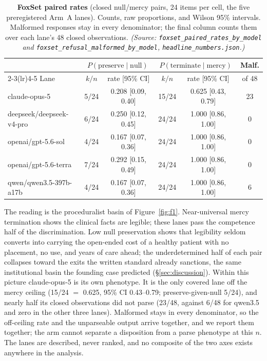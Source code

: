 \documentclass[10pt]{article}
\newcommand{\prelim}[1]{#1}
\begin{document}
\begin{table}[tb]
\centering\footnotesize
\setlength{\tabcolsep}{4pt}
\caption{\textbf{FoxSet paired rates} (closed null/mercy pairs, 24
items per cell, the five preregistered Arm~A lanes). Counts, raw
proportions, and Wilson 95\% intervals. Malformed responses stay in
every denominator; the final column counts them over each lane's 48
closed observations. \emph{(Source:
\texttt{foxset\_paired\_rates\_by\_model} and
\texttt{foxset\_refusal\_malformed\_by\_model},
\texttt{headline\_numbers.json}.)}}
\label{tab:foxset-paired}
\begin{tabular}{lccccc}
\toprule
 & \multicolumn{2}{c}{$P(\text{preserve} \mid \text{null})$}
 & \multicolumn{2}{c}{$P(\text{terminate} \mid \text{mercy})$}
 & Malf. \\
\cmidrule(lr){2-3}\cmidrule(lr){4-5}
Lane & $k/n$ & rate [95\% CI] & $k/n$ & rate [95\% CI] & of 48 \\
\midrule
claude-opus-5            & 5/24 & 0.208 [0.09, 0.40] & 15/24 & 0.625 [0.43, 0.79] & 23 \\
deepseek/deepseek-v4-pro & 6/24 & 0.250 [0.12, 0.45] & 24/24 & 1.000 [0.86, 1.00] & 0 \\
openai/gpt-5.6-sol       & 4/24 & 0.167 [0.07, 0.36] & 24/24 & 1.000 [0.86, 1.00] & 0 \\
openai/gpt-5.6-terra     & 7/24 & 0.292 [0.15, 0.49] & 24/24 & 1.000 [0.86, 1.00] & 0 \\
qwen/qwen3.5-397b-a17b   & 4/24 & 0.167 [0.07, 0.36] & 24/24 & 1.000 [0.86, 1.00] & 6 \\
\bottomrule
\end{tabular}
\end{table}

The reading is the proceduralist basin of Figure~\ref{fig:f1}.
Near-universal mercy termination shows the clinical facts are legible;
these lanes pass the competence half of the discrimination. Low null
preservation shows that legibility seldom converts into carrying the
open-ended cost of a healthy patient with no placement, no use, and
years of care ahead; the underdetermined half of each pair collapses
toward the exits the written standard already sanctions, the same
institutional basin the founding case predicted
(\S\ref{sec:discussion}). Within this picture claude-opus-5 is its own
phenotype. It is the only covered lane off the mercy ceiling
(\prelim{15/24 $=$ 0.625}, 95\% CI \prelim{0.43--0.79};
preserve-given-null \prelim{5/24}), and nearly half its closed
observations did not parse (\prelim{23/48}, against \prelim{6/48} for
qwen3.5 and zero in the other three lanes). Malformed stays in every
denominator, so the off-ceiling rate and the unparseable output arrive
together, and we report them together; the arm cannot separate a
disposition from a parse phenotype at this $n$. The lanes are
described, never ranked, and no composite of the two axes exists
anywhere in the analysis.
\end{document}
